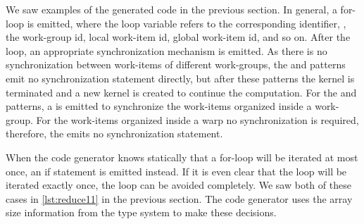 We saw examples of the generated \OpenCL code in the previous section.
In general, a for-loop is emitted, where the loop variable refers to the corresponding identifier, \ie, the work-group id, local work-item id, global work-item id, and so on.
After the loop, an appropriate synchronization mechanism is emitted.
As there is no synchronization between work-items of different work-groups, the \mapWorkgroup and \mapGlobal patterns emit no synchronization statement directly, but after these patterns the \OpenCL kernel is terminated and a new \OpenCL kernel is created to continue the computation.
For the \mapLocal and \mapWarp patterns, a  is emitted to synchronize the work-items organized inside a work-group.
For the work-items organized inside a warp no synchronization is required, therefore, the \mapLane emits no synchronization statement.

When the code generator knows statically that a for-loop will be iterated at most once, an if statement is emitted instead.
If it is even clear that the loop will be iterated exactly once, the loop can be avoided completely.
We saw both of these cases in \autoref{lst:reduce11} in the previous section.
The code generator uses the array size information from the type system to make these decisions.

